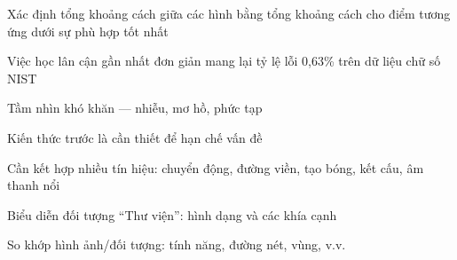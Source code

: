 \documentclass{article}
\begin{document}
\begin{huge}


Xác định tổng khoảng cách giữa các hình bằng tổng khoảng cách cho
điểm tương ứng dưới sự phù hợp tốt nhất

\textwidth
{}

Việc học lân cận gần nhất đơn giản mang lại tỷ lệ lỗi 0,63\% trên dữ liệu chữ số NIST



Tầm nhìn khó khăn --- nhiễu, mơ hồ, phức tạp

Kiến thức trước là cần thiết để hạn chế vấn đề

Cần kết hợp nhiều tín hiệu: chuyển động, đường viền, tạo bóng, kết cấu, âm thanh nổi

Biểu diễn đối tượng ``Thư viện'': hình dạng và các khía cạnh

So khớp hình ảnh/đối tượng: tính năng, đường nét, vùng, v.v.




\end{huge}
\end{document}
